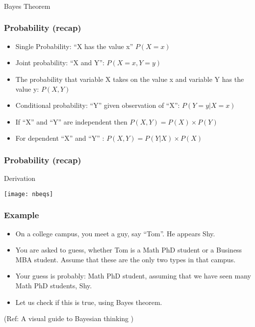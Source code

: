 \begin{frame}[fragile]\frametitle{}
\begin{center}
{\Large Bayes Theorem}
\end{center}
\end{frame}


\begin{frame}[fragile]\frametitle{Probability (recap)}

\begin{itemize}
\item Single Probability: ``X has the value x'' $P(X=x)$
\item Joint probability: ``X and Y'': $P(X=x, Y=y)$
\item The probability that variable X takes on the value x and variable Y has the value y: $P(X , Y)$
\item Conditional probability: ``Y'' given observation of ``X'': $P( Y=y | X=x )$
\item If ``X'' and ``Y'' are independent then $P(X , Y) = P(X) \times P(Y)$
\item For dependent ``X'' and ``Y'' : $P(X , Y) = P(Y|X) \times P(X)$
\end{itemize}

\end{frame}


\begin{frame}[fragile]\frametitle{Probability (recap)}
Derivation
\begin{center}
\texttt{[image: nbeqs]}
\end{center}
\end{frame}

\begin{frame}[fragile]\frametitle{Example}

\begin{itemize}
\item On a college campus, you meet a guy, say ``Tom''. He appears Shy. 
\item You are asked to guess, whether Tom is a Math PhD student or a Business MBA student. Assume that these are the only two types in that campus.
\item Your guess is probably: Math PhD student, assuming that we have seen many Math PhD students, Shy.
\item Let us check if this is true, using Bayes theorem.
\end{itemize}

{\tiny (Ref: A visual guide to Bayesian thinking )}
\end{frame}

